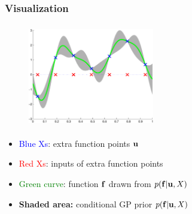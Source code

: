 \documentclass{beamer}
\begin{document}
%
%
%
%
%             
% 
%
%


\frame
{

\frametitle{Visualization} 


\begin{figure}
\includegraphics[width=55mm,height=45mm]{../../../vargplvm/tex/diagrams/Ind1}
\end{figure}

\begin{itemize}

\item \textcolor{blue}{Blue Xs}: extra function points $\mathbf{u}$
\item \textcolor{red}{Red Xs}: inputs of  extra function points
\item \textcolor{green}{Green curve}: function $\mathbf{f}$ drawn from 
      $p(\mathbf{f}|\mathbf{u},X)$
\item {\bf Shaded area:} conditional GP prior $p(\mathbf{f}|\mathbf{u},X)$


%
% 

\end{itemize}


}
\end{document}
